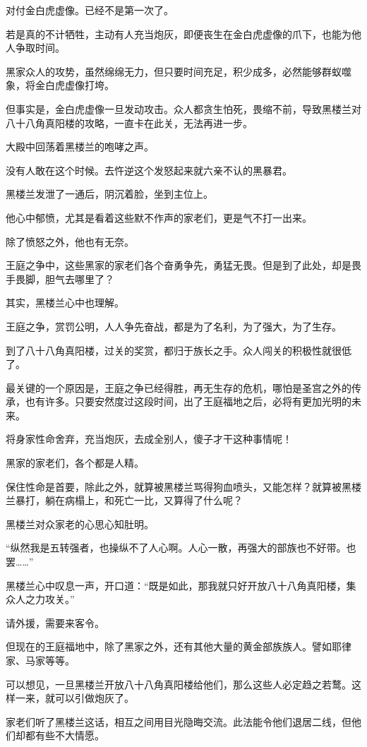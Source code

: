 \begin{this_body}
对付金白虎虚像。已经不是第一次了。

若是真的不计牺牲，主动有人充当炮灰，即便丧生在金白虎虚像的爪下，也能为他人争取时间。

黑家众人的攻势，虽然绵绵无力，但只要时间充足，积少成多，必然能够群蚁噬象，将金白虎虚像打垮。

但事实是，金白虎虚像一旦发动攻击。众人都贪生怕死，畏缩不前，导致黑楼兰对八十八角真阳楼的攻略，一直卡在此关，无法再进一步。

大殿中回荡着黑楼兰的咆哮之声。

没有人敢在这个时候。去忤逆这个发怒起来就六亲不认的黑暴君。

黑楼兰发泄了一通后，阴沉着脸，坐到主位上。

他心中郁愤，尤其是看着这些默不作声的家老们，更是气不打一出来。

除了愤怒之外，他也有无奈。

王庭之争中，这些黑家的家老们各个奋勇争先，勇猛无畏。但是到了此处，却是畏手畏脚，胆气去哪里了？

其实，黑楼兰心中也理解。

王庭之争，赏罚公明，人人争先奋战，都是为了名利，为了强大，为了生存。

到了八十八角真阳楼，过关的奖赏，都归于族长之手。众人闯关的积极性就很低了。

最关键的一个原因是，王庭之争已经得胜，再无生存的危机，哪怕是圣宫之外的传承，也有许多。只要安然度过这段时间，出了王庭福地之后，必将有更加光明的未来。

将身家性命舍弃，充当炮灰，去成全别人，傻子才干这种事情呢！

黑家的家老们，各个都是人精。

保住性命是首要，除此之外，就算被黑楼兰骂得狗血喷头，又能怎样？就算被黑楼兰暴打，躺在病榻上，和死亡一比，又算得了什么呢？

黑楼兰对众家老的心思心知肚明。

“纵然我是五转强者，也操纵不了人心啊。人心一散，再强大的部族也不好带。也罢……”

黑楼兰心中叹息一声，开口道：“既是如此，那我就只好开放八十八角真阳楼，集众人之力攻关。”

请外援，需要来客令。

但现在的王庭福地中，除了黑家之外，还有其他大量的黄金部族族人。譬如耶律家、马家等等。

可以想见，一旦黑楼兰开放八十八角真阳楼给他们，那么这些人必定趋之若鹜。这样一来，就可以引做炮灰了。

家老们听了黑楼兰这话，相互之间用目光隐晦交流。此法能令他们退居二线，但他们却都有些不大情愿。


\end{this_body}
